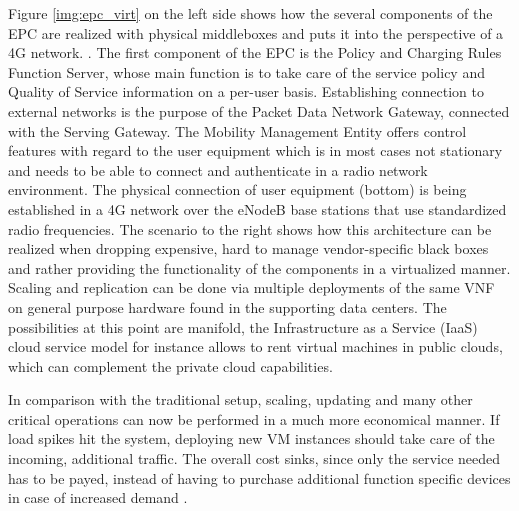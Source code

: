 Figure \ref{img:epc_virt} on the left side shows how the several components of the EPC are realized with physical middleboxes and puts it into the perspective of a 4G network. . The first component of the EPC is the Policy and Charging Rules Function Server, whose main function is to take care of the service policy and Quality of Service information on a per-user basis. Establishing connection to external networks is the purpose of the Packet Data Network Gateway, connected with the Serving Gateway. The Mobility Management Entity offers control features with regard to the user equipment which is in most cases not stationary and needs to be able to connect and authenticate in a radio network environment. The physical connection of user equipment (bottom) is being established in a 4G network over the eNodeB base stations that use standardized radio frequencies. The scenario to the right shows how this architecture can be realized when dropping expensive, hard to manage vendor-specific black boxes and rather providing the functionality of the components in a virtualized manner. Scaling and replication can be done via multiple deployments of the same VNF on general purpose hardware found in the supporting data centers. The possibilities at this point are manifold, the Infrastructure as a Service (IaaS) cloud service model for instance allows to rent virtual machines in public clouds, which can complement the private cloud capabilities. 

In comparison with the traditional setup, scaling, updating and many other critical operations can now be performed in a much more economical manner. If load spikes hit the system, deploying new VM instances should take care of the incoming, additional traffic. The overall cost sinks, since only the service needed has to be payed, instead of having to purchase additional function specific devices in case of increased demand \cite{4g} \cite{mijumbi2016network}. 


